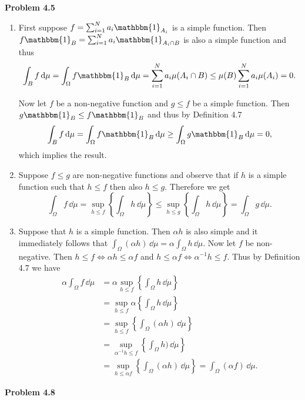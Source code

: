 \textbf{Problem 4.5}
\begin{enumerate}[label={(\alph*)}]
\item First suppose $f = \sum_{i = 1}^N a_i \mathbbm{1}_{A_i}$ is a simple function. Then $f \mathbbm{1}_B = \sum_{i = 1}^N a_i \mathbbm{1}_{A_i \cap B}$ is also a simple function and thus
\[
	\int_B f \, \dd \mu = \int_\Omega f \mathbbm{1}_B \, \dd \mu = \sum_{i = 1}^N a_i \mu(A_i \cap B) \le \mu(B) \sum_{i = 1}^N a_i \mu(A_i) = 0.
\]

Now let $f$ be a non-negative function and $g \le f$ be a simple function. Then $g \mathbbm{1}_B \le f \mathbbm{1}_B$ and thus by Definition 4.7
\begin{align*}
	\int_B f \, \dd \mu = \int_\Omega f \mathbbm{1}_B \, \dd \mu \ge \int_\Omega g \mathbbm{1}_B \, \dd \mu = 0,
\end{align*}
which implies the result.

\item Suppose $f \le g$ are non-negative functions and observe that if $h$ is a simple function such that $h \le f$ then also $h \le g$. Therefore we get
\[
	\int_\Omega f \, \dd \mu = \sup_{h \le f}\left\{\int_\Omega h \, \dd \mu\right\}
	\le \sup_{h \le g}\left\{\int_\Omega h \, \dd \mu\right\} = \int_\Omega g \, \dd \mu.
\]
\item Suppose that $h$ is a simple function. Then $\alpha h$ is also simple and it immediately follows that $\int_\Omega (\alpha h) \, \dd \mu = \alpha \int_\Omega h \, \dd \mu$. Now let $f$ be non-negative. Then $h \le f \iff \alpha h \le \alpha f$ and $h \le \alpha f \iff \alpha^{-1} h \le f$. Thus by Definition 4.7 we have
\begin{align*}
	\alpha \int_\Omega f \, \dd \mu &= \alpha \sup_{h \le f}\left\{\int_\Omega h \, \dd \mu\right\}\\
	&= \sup_{h \le f} \alpha \left\{\int_\Omega  h \, \dd \mu\right\}\\
	&= \sup_{h \le f} \left\{\int_\Omega (\alpha h) \, \dd \mu\right\}\\
	&= \sup_{\alpha^{-1} h \le f} \left\{\int_\Omega h) \, \dd \mu\right\}\\
	&= \sup_{h \le \alpha f} \left\{\int_\Omega (\alpha h) \, \dd \mu\right\} = \int_\Omega (\alpha f) \, \dd \mu.
\end{align*}
\end{enumerate}

\bigskip

\textbf{Problem 4.8}

